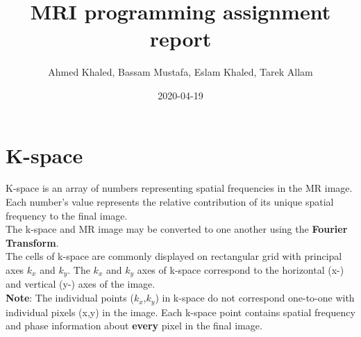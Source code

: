 \documentclass{article}
\title{MRI programming assignment report}
\date{2020-04-19}
\author{Ahmed Khaled, Bassam Mustafa, Eslam Khaled, Tarek Allam}
\begin{document}
	\maketitle
	\newpage
	
	\section{K-space}
K-space is an array of numbers representing spatial frequencies in the MR image.
\\
Each number's value represents the relative contribution of its unique spatial frequency to the final image.
\\
The k-space and MR image may be converted to one another using the \textbf{Fourier Transform}.
\\
The cells of k-space are commonly displayed on rectangular grid with principal axes $k_x$ and $k_y$. The $k_x$ and $k_y$ axes of k-space correspond to the horizontal (x-) and vertical (y-) axes of the image.
\\
\textbf{Note}: The individual points ($k_x$,$k_y$) in k-space do not correspond one-to-one with individual pixels (x,y) in the image. Each k-space point contains spatial frequency and phase information about \textbf{every} pixel in the final image.
  
\end{document}
